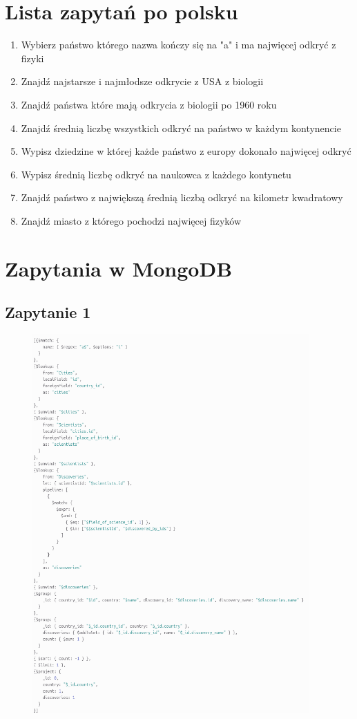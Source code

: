 \documentclass[11pt]{article}
\begin{document}
\section{Lista zapytań po polsku}
	\begin{enumerate}
		\item  Wybierz państwo którego nazwa kończy się na "a" i ma najwięcej odkryć z fizyki
		\item Znajdź najstarsze i najmłodsze odkrycie z USA z biologii
		\item Znajdź państwa które mają odkrycia z biologii po 1960 roku
		\item Znajdź średnią liczbę wszystkich odkryć na państwo w każdym kontynencie
		\item  Wypisz dziedzine w której każde państwo z europy dokonało najwięcej odkryć
		\item  Wypisz średnią liczbę odkryć na naukowca z każdego kontynetu
		\item  Znajdź państwo z największą średnią liczbą odkryć na kilometr kwadratowy
		\item Znajdź miasto z którego pochodzi najwięcej fizyków
	\end{enumerate}

\newpage
\section{Zapytania w MongoDB}
	\subsection{Zapytanie 1}
		\begin{figure}[!ht]
			\begin{center}
				\includegraphics[width=400px]{m1.png}
			\end{center}
		\end{figure}
\end{document}
